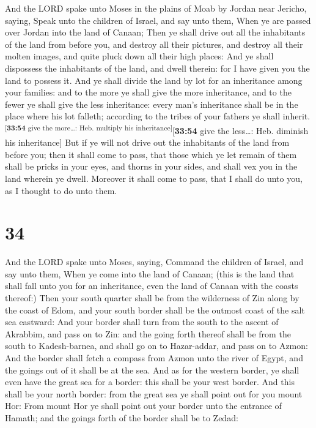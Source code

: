  And the LORD spake unto Moses in the plains of Moab by
Jordan near Jericho, saying,  Speak unto the children of
Israel, and say unto them, When ye are passed over Jordan into the land
of Canaan;  Then ye shall drive out all the inhabitants
of the land from before you, and destroy all their pictures, and destroy
all their molten images, and quite pluck down all their high places:
 And ye shall dispossess the inhabitants of the land, and
dwell therein: for I have given you the land to possess it.
 And ye shall divide the land by lot for an inheritance
among your families: and to the more ye shall give the more inheritance,
and to the fewer ye shall give the less inheritance: every man's
inheritance shall be in the place where his lot falleth; according to
the tribes of your fathers ye shall
inherit.\textsuperscript{{[}\textbf{33:54} give the more\ldots: Heb.
multiply his inheritance{]}}{[}\textbf{33:54} give the less\ldots: Heb.
diminish his inheritance{]}  But if ye will not drive out
the inhabitants of the land from before you; then it shall come to pass,
that those which ye let remain of them shall be pricks in your eyes, and
thorns in your sides, and shall vex you in the land wherein ye dwell.
 Moreover it shall come to pass, that I shall do unto
you, as I thought to do unto them.

\hypertarget{section-33}{%
\section{34}\label{section-33}}

 And the LORD spake unto Moses, saying, 
Command the children of Israel, and say unto them, When ye come into the
land of Canaan; (this is the land that shall fall unto you for an
inheritance, even the land of Canaan with the coasts thereof:)
 Then your south quarter shall be from the wilderness of
Zin along by the coast of Edom, and your south border shall be the
outmost coast of the salt sea eastward:  And your border
shall turn from the south to the ascent of Akrabbim, and pass on to Zin:
and the going forth thereof shall be from the south to Kadesh-barnea,
and shall go on to Hazar-addar, and pass on to Azmon:  And
the border shall fetch a compass from Azmon unto the river of Egypt, and
the goings out of it shall be at the sea.  And as for the
western border, ye shall even have the great sea for a border: this
shall be your west border.  And this shall be your north
border: from the great sea ye shall point out for you mount Hor:
 From mount Hor ye shall point out your border unto the
entrance of Hamath; and the goings forth of the border shall be to
Zedad:

